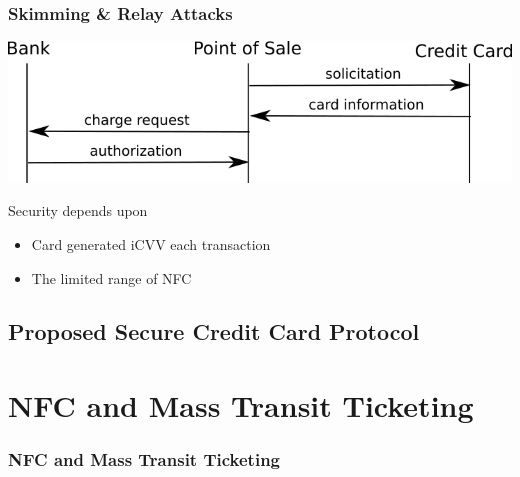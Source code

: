 \documentclass[unknownkeysallowed]{beamer}
\begin{document}
\begin{frame}
\frametitle{Skimming \& Relay Attacks}
  \begin{center}
  \includegraphics[scale=.5]{../TomPaper/figures/CCcurrent.png}\newline
    \begin{minipage}{.6\textwidth}
      \vspace{3mm}
      \begin{block}{Security depends upon}
        \begin{itemize}
          \item{Card generated iCVV each transaction}
          \item{The limited range of NFC}
        \end{itemize}
      \end{block}
    \end{minipage}
  \end{center}
\end{frame}



\subsection{Proposed Secure Credit Card Protocol}

\section{NFC and Mass Transit Ticketing}
\begin{frame}
\frametitle{NFC and Mass Transit Ticketing}
\begin{center}\begin{minipage}{.9\textwidth}
\tableofcontents[currentsubsection, hideothersubsections, sectionstyle=show/shaded]
\end{minipage}\end{center}
\end{frame}
%
\end{document}
